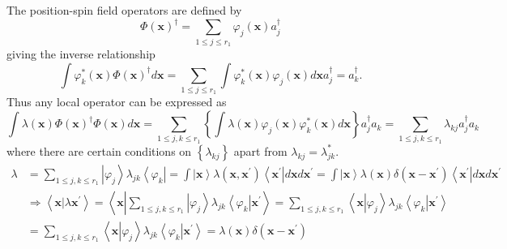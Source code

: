 \documentclass[aps,preprint]{revtex4}%
\begin{document}
The position-spin field operators are defined by
\begin{equation}
\Phi\left(  \mathbf{x}\right)  ^{\dagger}=\sum_{1\leq j\leq r_{1}}\varphi
_{j}\left(  \mathbf{x}\right)  a_{j}^{\dagger}%
\end{equation}
giving the inverse relationship%
\begin{equation}
\int\varphi_{k}^{\ast}\left(  \mathbf{x}\right)  \Phi\left(  \mathbf{x}%
\right)  ^{\dagger}d\mathbf{x}=\sum_{1\leq j\leq r_{1}}\int\varphi_{k}^{\ast
}\left(  \mathbf{x}\right)  \varphi_{j}\left(  \mathbf{x}\right)
d\mathbf{x}a_{j}^{\dagger}=a_{k}^{\dagger}.
\end{equation}
Thus any local operator can be expressed as%
\begin{equation}
\int\lambda\left(  \mathbf{x}\right)  \Phi\left(  \mathbf{x}\right)
^{\dagger}\Phi\left(  \mathbf{x}\right)  d\mathbf{x}=\sum_{1\leq j,k\leq
r_{1}}\left\{  \int\lambda\left(  \mathbf{x}\right)  \varphi_{j}\left(
\mathbf{x}\right)  \varphi_{k}^{\ast}\left(  \mathbf{x}\right)  d\mathbf{x}%
\right\}  a_{j}^{\dagger}a_{k}=\sum_{1\leq j,k\leq r_{1}}\lambda_{kj}%
a_{j}^{\dagger}a_{k}%
\end{equation}
where there are certain conditions on $\left\{  \lambda_{kj}\right\}  $ apart
from $\lambda_{kj}=\lambda_{jk}^{\ast}.$%
\begin{align}
\lambda & =\sum_{1\leq j,k\leq r_{1}}\left\vert \varphi_{j}\right\rangle
\lambda_{jk}\left\langle \varphi_{k}\right\vert =\int\left\vert \mathbf{x}%
\right\rangle \lambda\left(  \mathbf{x,x}^{\prime}\right)  \left\langle
\mathbf{x}^{\prime}\right\vert d\mathbf{x}d\mathbf{x}^{\prime}=\int\left\vert
\mathbf{x}\right\rangle \lambda\left(  \mathbf{x}\right)  \delta\left(
\mathbf{x-x}^{\prime}\right)  \left\langle \mathbf{x}^{\prime}\right\vert
d\mathbf{x}d\mathbf{x}^{\prime}\nonumber\\
& \Rightarrow\left\langle \mathbf{x}\left\vert \lambda\right.  \mathbf{x}%
^{\prime}\right\rangle =\left\langle \mathbf{x}\left\vert \sum_{1\leq j,k\leq
r_{1}}\left\vert \varphi_{j}\right\rangle \lambda_{jk}\left\langle \varphi
_{k}\right\vert \right.  \mathbf{x}^{\prime}\right\rangle =\sum_{1\leq j,k\leq
r_{1}}\left\langle \mathbf{x}\left\vert \varphi_{j}\right.  \right\rangle
\lambda_{jk}\left\langle \varphi_{k}\left\vert \mathbf{x}^{\prime}\right.
\right\rangle \nonumber\\
& =\sum_{1\leq j,k\leq r_{1}}\left\langle \mathbf{x}\left\vert \varphi
_{j}\right.  \right\rangle \lambda_{jk}\left\langle \varphi_{k}\left\vert
\mathbf{x}^{\prime}\right.  \right\rangle =\lambda\left(  \mathbf{x}\right)
\delta\left(  \mathbf{x-x}^{\prime}\right)
\end{align}
\end{document}
